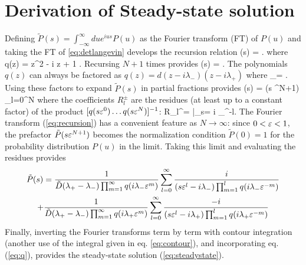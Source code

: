 \section{Derivation of Steady-state solution}
\label{sec:langsteadyderiv}
Defining $\tilde{P}(s) = \int_{-\infty}^\infty du e^{i u s} P(u) $ as the Fourier transform (FT) of $P(u)$ and taking the FT of \ref{eq:detlangevin} develops the recursion relation
\be {}(s) = . \ee
where
\be q(z) =  z^2 - i \tilde{\Gamma} z + 1 . \label{eq:q} \ee
Recursing $N+1$ times provides
\be {}(s) = .\label{eq:recursion}\ee
The polynomials $q(z)$ can always be factored as $q(z) = d(z - i\lambda_-)(z - i\lambda_+)$ where
\be \lambda_\pm = . \label{eq:lambdas}\ee
Using these factors to expand $\tilde{P}(s)$ in partial fractions provides
\be {}(s)  = (s \ve^{N+1}) \sum_{l=0}^N   \ee
where the coefficients $R_l^\pm$ are the residues (at least up to a constant factor) of the product $[q(s\varepsilon^0)\dots q(s\varepsilon^N)]^{-1}$:
\be R_l^\pm =  \Big|_{s= i \lambda_\pm \ve^{-l}}.\ee
The Fourier transform (\ref{eq:recursion}) has a convenient feature as $N\rightarrow \infty$: since $0<\varepsilon <1$, the prefactor $\tilde{P}( s \varepsilon^{N+1})$ becomes the normalization condition $\tilde{P}(0)=1$ for the probability distribution $P(u)$ in the limit.
Taking this limit and evaluating the residues provides 
\begin{multline} \tilde{P}(s) = \frac{1}{\tilde{D}(\lambda_+ - \lambda_-) \prod_{m=1}^\infty q(i \lambda_- \varepsilon^m)} \sum_{l=0}^\infty \frac{i}{(s\varepsilon^l-i\lambda_-)\prod_{m=1}^l q(i\lambda_- \varepsilon^{-m})} 
	\\+ \frac{1}{\tilde{D}(\lambda_+ - \lambda_-) \prod_{m=1}^\infty q(i \lambda_+ \varepsilon^m)} \sum_{l=0}^\infty \frac{-i}{(s\varepsilon^l-i \lambda_+)\prod_{m=1}^l q(i\lambda_+ \varepsilon^{-m})} \end{multline}
Finally, inverting the Fourier transforms term by term with contour integration (another use of the integral given in eq. \ref{eq:contour}), and incorporating eq. (\ref{eq:q}), provides the steady-state solution (\ref{eq:steadystate}).


